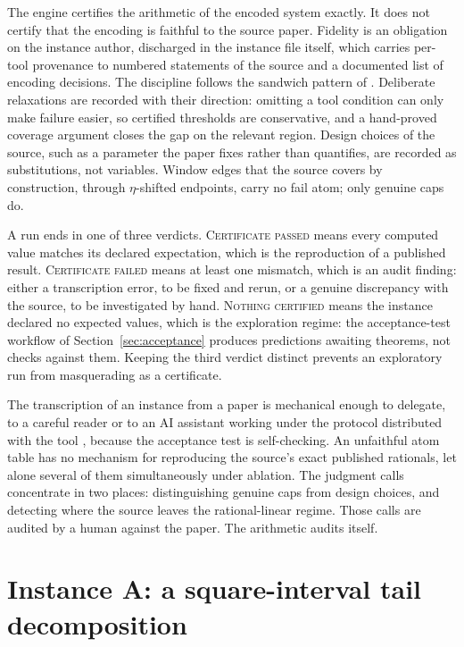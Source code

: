 \documentclass[11pt]{article}
\begin{document}
The engine certifies the arithmetic of the encoded system exactly. It
does not certify that the encoding is faithful to the source paper.
Fidelity is an obligation on the instance author, discharged in the
instance file itself, which carries per-tool provenance to numbered
statements of the source and a documented list of encoding decisions.
The discipline follows the sandwich pattern of \cite{ross-inventory}.
Deliberate relaxations are recorded with their direction: omitting a
tool condition can only make failure easier, so certified thresholds
are conservative, and a hand-proved coverage argument closes the gap
on the relevant region. Design choices of the source, such as a
parameter the paper fixes rather than quantifies, are recorded as
substitutions, not variables. Window edges that the source covers by
construction, through $\eta$-shifted endpoints, carry no fail atom;
only genuine caps do.

A run ends in one of three verdicts. \textsc{Certificate passed} means
every computed value matches its declared expectation, which is the
reproduction of a published result. \textsc{Certificate failed} means
at least one mismatch, which is an audit finding: either a
transcription error, to be fixed and rerun, or a genuine discrepancy
with the source, to be investigated by hand. \textsc{Nothing
certified} means the instance declared no expected values, which is
the exploration regime: the acceptance-test workflow of
Section~\ref{sec:acceptance} produces predictions awaiting theorems,
not checks against them. Keeping the third verdict distinct prevents
an exploratory run from masquerading as a certificate.

The transcription of an instance from a paper is mechanical enough to
delegate, to a careful reader or to an AI assistant working under the
protocol distributed with the tool \cite{repo}, because the acceptance
test is self-checking. An unfaithful atom table has no mechanism for
reproducing the source's exact published rationals, let alone several
of them simultaneously under ablation. The judgment calls concentrate
in two places: distinguishing genuine caps from design choices, and
detecting where the source leaves the rational-linear regime. Those
calls are audited by a human against the paper. The arithmetic audits
itself.

\section{Instance A: a square-interval tail decomposition}
\label{sec:jn}
\end{document}
